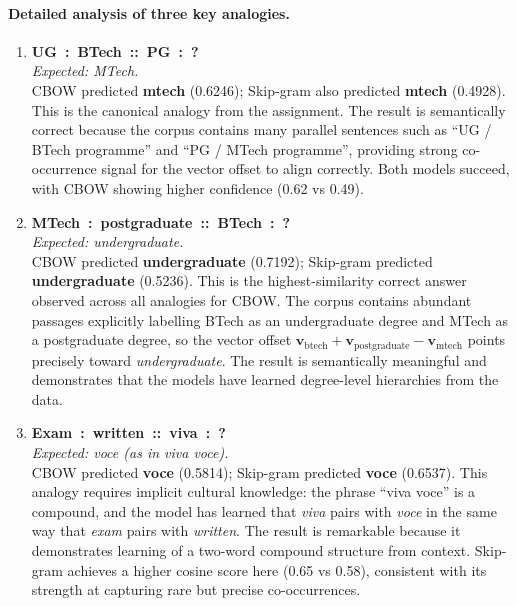 \documentclass[12pt,a4paper]{article}
\begin{document}
\paragraph{Detailed analysis of three key analogies.}

\begin{enumerate}[leftmargin=1.4em, label=\textbf{\arabic*.}]

    \item \textbf{UG~:~BTech~::~PG~:~?}\\
    \textit{Expected: MTech.}\\
    CBOW predicted \textbf{mtech} (0.6246); Skip-gram also predicted
    \textbf{mtech} (0.4928). This is the canonical analogy from the
    assignment. The result is semantically correct because the corpus
    contains many parallel sentences such as ``UG / BTech programme'' and
    ``PG / MTech programme'', providing strong co-occurrence signal for
    the vector offset to align correctly. Both models succeed, with CBOW
    showing higher confidence (0.62 vs 0.49).

    \item \textbf{MTech~:~postgraduate~::~BTech~:~?}\\
    \textit{Expected: undergraduate.}\\
    CBOW predicted \textbf{undergraduate} (0.7192); Skip-gram predicted
    \textbf{undergraduate} (0.5236). This is the highest-similarity correct
    answer observed across all analogies for CBOW. The corpus contains abundant
    passages explicitly labelling BTech as an undergraduate degree and MTech as
    a postgraduate degree, so the vector offset $\mathbf{v}_{\text{btech}} +
    \mathbf{v}_{\text{postgraduate}} - \mathbf{v}_{\text{mtech}}$ points
    precisely toward \textit{undergraduate}. The result is semantically
    meaningful and demonstrates that the models have learned degree-level
    hierarchies from the data.

    \item \textbf{Exam~:~written~::~viva~:~?}\\
    \textit{Expected: voce (as in viva voce).}\\
    CBOW predicted \textbf{voce} (0.5814); Skip-gram predicted \textbf{voce}
    (0.6537). This analogy requires implicit cultural knowledge: the phrase
    ``viva voce'' is a compound, and the model has learned that \textit{viva}
    pairs with \textit{voce} in the same way that \textit{exam} pairs with
    \textit{written}. The result is remarkable because it demonstrates learning
    of a two-word compound structure from context. Skip-gram achieves a higher
    cosine score here (0.65 vs 0.58), consistent with its strength at capturing
    rare but precise co-occurrences.

\end{enumerate}
\end{document}
